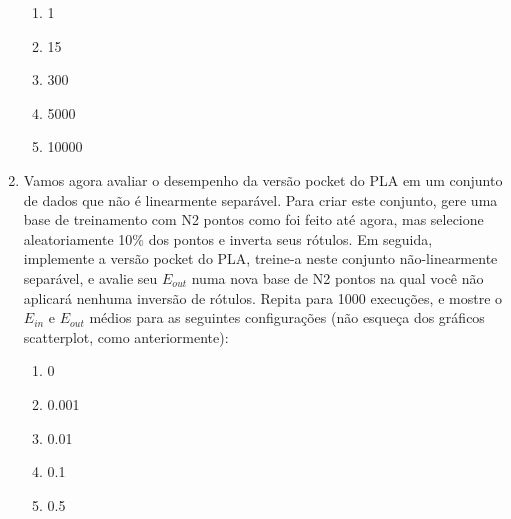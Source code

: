 \begin{enumerate}
    \begin{enumerate}
        \item 1
        \item 15
        \item 300
        \item 5000
        \item 10000
    \end{enumerate}
    
    \item Vamos agora avaliar o desempenho da versão pocket do PLA em um conjunto de dados que não é linearmente separável. Para criar este conjunto, gere uma base de treinamento com N2 pontos como foi feito até agora, mas selecione aleatoriamente 10\% dos pontos e inverta seus rótulos. Em seguida, implemente a versão pocket do PLA, treine-a neste conjunto não-linearmente separável, e avalie seu $E_{out}$ numa nova base de N2 pontos na qual você não aplicará nenhuma inversão de rótulos. Repita para 1000 execuções, e mostre o $E_{in}$ e $E_{out}$ médios para as seguintes configurações (não esqueça dos gráficos scatterplot, como anteriormente):
    
    \begin{enumerate}
        \item 0
        \item 0.001
        \item 0.01
        \item 0.1
        \item 0.5
    \end{enumerate}

    
\end{enumerate}